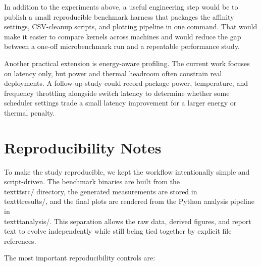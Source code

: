 \documentclass[conference]{IEEEtran}
\begin{document}
In addition to the experiments above, a useful engineering step would be to publish
a small reproducible benchmark harness that packages the affinity settings,
CSV-cleanup scripts, and plotting pipeline in one command.  That would make it
easier to compare kernels across machines and would reduce the gap between a one-off
microbenchmark run and a repeatable performance study.

Another practical extension is energy-aware profiling.  The current work focuses on
latency only, but power and thermal headroom often constrain real deployments.  A
follow-up study could record package power, temperature, and frequency throttling
alongside switch latency to determine whether some scheduler settings trade a small
latency improvement for a larger energy or thermal penalty.

\section{Reproducibility Notes}
\label{sec:repro}

To make the study reproducible, we kept the workflow intentionally simple and script-driven.
The benchmark binaries are built from the \\texttt{src/} directory, the generated
measurements are stored in \\texttt{results/}, and the final plots are rendered from the
Python analysis pipeline in \\texttt{analysis/}.  This separation allows the raw data,
derived figures, and report text to evolve independently while still being tied together
by explicit file references.

The most important reproducibility controls are:
\end{document}
